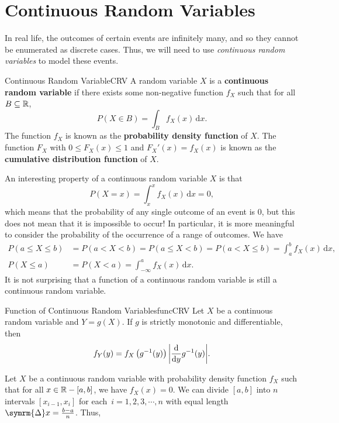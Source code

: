 \documentclass[math]{amznotes}
\theoremstyle{remark}
\newcommand{\0}{\mathbf{0}}
\newcommand{\1}{\mathbf{1}}
\renewcommand{\d}{\mathrm{d}}
\begin{document}
\section{Continuous Random Variables}
In real life, the outcomes of certain events are infinitely many, and so they cannot be enumerated as discrete cases. Thus, we will need to use \textit{continuous random variables} to model these events.
\begin{dfnbox}{Continuous Random Variable}{CRV}
    A random variable $X$ is a {\color{red} \textbf{continuous random variable}} if there exists some non-negative function $f_X$ such that for all $B \subseteq \mathbb{R}$,
    \begin{equation*}
        P(X \in B) = \int_B\!f_X(x)\,\mathrm{d}x.
    \end{equation*}
    The function $f_X$ is known as the {\color{red} \textbf{probability density function}} of $X$. The function $F_X$ with $0 \leq F_X(x) \leq 1$ and $F_X'(x) = f_X(x)$ is known as the {\color{red} \textbf{cumulative distribution function}} of $X$.
\end{dfnbox}
An interesting property of a continuous random variable $X$ is that
\begin{equation*}
    P(X = x) = \int_{x}^{x}\!f_X(x) \,\mathrm{d}x = 0,
\end{equation*}
which means that the probability of any single outcome of an event is $0$, but this does not mean that it is impossible to occur! In particular, it is more meaningful to consider the probability of the occurrence of a range of outcomes. We have
\begin{align*}
    P(a \leq X \leq b) & = P(a < X < b) = P(a \leq X < b) = P(a < X \leq b) = \int_{a}^{b}\!f_X(x) \,\mathrm{d}x, \\
    P(X \leq a) & = P(X < a) = \int_{-\infty}^{a}\!f_X(x) \,\mathrm{d}x.
\end{align*}
It is not surprising that a function of a continuous random variable is still a continuous random variable.
\begin{thmbox}{Function of Continuous Random Variables}{funcCRV}
    Let $X$ be a continuous random variable and $Y = g(X)$. If $g$ is strictly monotonic and differentiable, then 
    \begin{equation*}
        f_Y(y) = f_X\left(g^{-1}(y)\right)\abs{\frac{\d}{\d y}g^{-1}(y)}.
    \end{equation*}
\end{thmbox}
Let $X$ be a continuous random variable with probability density function $f_X$ such that for all $x \in \mathbb{R} - [a, b]$, we have $f_X(x) = 0$. We can divide $[a, b]$ into $n$ intervals $[x_{i - 1}, x_i]$ for each~$i = 1, 2, 3, \cdots, n$ with equal length $\symrm{\Delta} x = \frac{b - a}{n}$. Thus,
\end{document}
